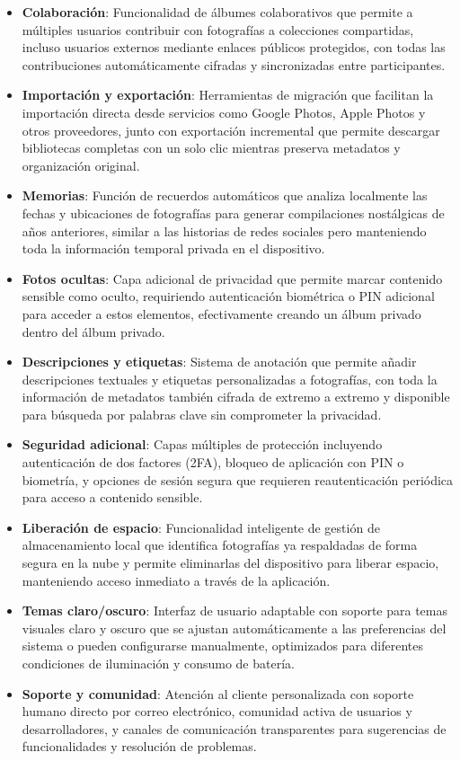\begin{itemize}
    \item \textbf{Colaboración}: Funcionalidad de álbumes colaborativos que permite a múltiples usuarios contribuir con fotografías a colecciones compartidas, incluso usuarios externos mediante enlaces públicos protegidos, con todas las contribuciones automáticamente cifradas y sincronizadas entre participantes.
    \item \textbf{Importación y exportación}: Herramientas de migración que facilitan la importación directa desde servicios como Google Photos, Apple Photos y otros proveedores, junto con exportación incremental que permite descargar bibliotecas completas con un solo clic mientras preserva metadatos y organización original.
    \item \textbf{Memorias}: Función de recuerdos automáticos que analiza localmente las fechas y ubicaciones de fotografías para generar compilaciones nostálgicas de años anteriores, similar a las historias de redes sociales pero manteniendo toda la información temporal privada en el dispositivo.
    \item \textbf{Fotos ocultas}: Capa adicional de privacidad que permite marcar contenido sensible como oculto, requiriendo autenticación biométrica o PIN adicional para acceder a estos elementos, efectivamente creando un álbum privado dentro del álbum privado.
    \item \textbf{Descripciones y etiquetas}: Sistema de anotación que permite añadir descripciones textuales y etiquetas personalizadas a fotografías, con toda la información de metadatos también cifrada de extremo a extremo y disponible para búsqueda por palabras clave sin comprometer la privacidad.
    \item \textbf{Seguridad adicional}: Capas múltiples de protección incluyendo autenticación de dos factores (2FA), bloqueo de aplicación con PIN o biometría, y opciones de sesión segura que requieren reautenticación periódica para acceso a contenido sensible.
    \item \textbf{Liberación de espacio}: Funcionalidad inteligente de gestión de almacenamiento local que identifica fotografías ya respaldadas de forma segura en la nube y permite eliminarlas del dispositivo para liberar espacio, manteniendo acceso inmediato a través de la aplicación.
    \item \textbf{Temas claro/oscuro}: Interfaz de usuario adaptable con soporte para temas visuales claro y oscuro que se ajustan automáticamente a las preferencias del sistema o pueden configurarse manualmente, optimizados para diferentes condiciones de iluminación y consumo de batería.
    \item \textbf{Soporte y comunidad}: Atención al cliente personalizada con soporte humano directo por correo electrónico, comunidad activa de usuarios y desarrolladores, y canales de comunicación transparentes para sugerencias de funcionalidades y resolución de problemas.
\end{itemize}

